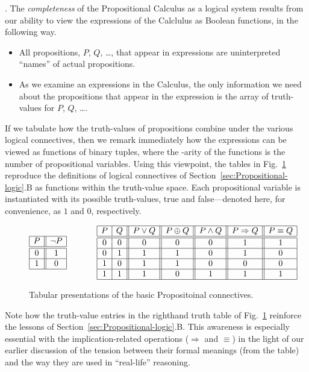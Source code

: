\bigskip

.
The {\em completeness} of the Propositional Calculus as a logical
system results from our ability to view the expressions of the
Calclulus as Boolean functions, in the following way.
\begin{itemize}
\item
All propositions, $P$, $Q$, \ldots, that appear in expressions are
uninterpreted ``names'' of actual propositions.
\item
As we examine an expressions in the Calculus, the only information we
need about the propositions that appear in the expression is the array
of truth-values for $P$, $Q$, \ldots.
\end{itemize}
If we tabulate how the truth-values of propositions combine under the
various logical connectives, then we remark immediately how the
expressions can be viewed as functions of binary tuples, where the
-arity of the functions is the number of propositional variables.
Using this viewpoint, the tables in Fig.~\ref{fig:defns-via-tables}
reproduce the definitions of logical connectives of
Section~\ref{sec:Propositional-logic}.B as functions within the
truth-value space.  Each propositional variable is instantiated with
its possible truth-values, {\sc true} and {\sc false}---denoted here,
for convenience, as $1$ and $0$, respectively.
\begin{figure}[hbt]
\[
\begin{array}{|c||c|}
\hline
P & \neg P \\
\hline
\hline
0 & 1 \\
\hline
1 & 0 \\
\hline
\end{array}
\hspace*{.5in}
\begin{array}{|c|c||c||c||c||c||c|}
\hline
P & Q & P \vee Q  & P \oplus Q & P \wedge Q & P \Rightarrow Q & P \equiv Q  \\
\hline
\hline
0 & 0 & 0 & 0 & 0 & 1 & 1 \\
\hline
0 & 1 & 1 & 1 & 0 & 1 & 0 \\
\hline
1 & 0 & 1 & 1 & 0 & 0 & 0 \\
\hline
1 & 1 & 1 & 0 & 1 & 1 & 1 \\
\hline
\end{array}
\]
\caption{Tabular presentations of the basic Propositoinal connectives.
\label{fig:defns-via-tables}}
\end{figure}
Note how the truth-value entries in the righthand truth table of
Fig.~\ref{fig:defns-via-tables} reinforce the lessons of
Section~\ref{sec:Propositional-logic}.B.  This awareness is especially
essential with the implication-related operations ($\Rightarrow$ and
$\equiv$) in the light of our earlier discussion of the tension
between their formal meanings (from the table) and the way they are
used in ``real-life'' reasoning.

